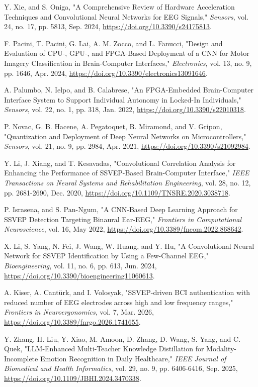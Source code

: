  Y. Xie, and S. Oniga, "A Comprehensive Review of Hardware Acceleration Techniques and Convolutional Neural Networks for EEG Signals," \textit{Sensors}, vol. 24, no. 17, pp. 5813, Sep. 2024, \url{https://doi.org/10.3390/s24175813}.

 F. Pacini, T. Pacini, G. Lai, A. M. Zocco, and L. Fanucci, "Design and Evaluation of CPU-, GPU-, and FPGA-Based Deployment of a CNN for Motor Imagery Classification in Brain-Computer Interfaces," \textit{Electronics}, vol. 13, no. 9, pp. 1646, Apr. 2024, \url{https://doi.org/10.3390/electronics13091646}.

 A. Palumbo, N. Ielpo, and B. Calabrese, "An FPGA-Embedded Brain-Computer Interface System to Support Individual Autonomy in Locked-In Individuals," \textit{Sensors}, vol. 22, no. 1, pp. 318, Jan. 2022, \url{https://doi.org/10.3390/s22010318}.

 P. Novac, G. B. Hacene, A. Pegatoquet, B. Miramond, and V. Gripon, "Quantization and Deployment of Deep Neural Networks on Microcontrollers," \textit{Sensors}, vol. 21, no. 9, pp. 2984, Apr. 2021, \url{https://doi.org/10.3390/s21092984}.

 Y. Li, J. Xiang, and T. Kesavadas, "Convolutional Correlation Analysis for Enhancing the Performance of SSVEP-Based Brain-Computer Interface," \textit{IEEE Transactions on Neural Systems and Rehabilitation Engineering}, vol. 28, no. 12, pp. 2681-2690, Dec. 2020, \url{https://doi.org/10.1109/TNSRE.2020.3038718}.

 P. Israsena, and S. Pan-Ngum, "A CNN-Based Deep Learning Approach for SSVEP Detection Targeting Binaural Ear-EEG," \textit{Frontiers in Computational Neuroscience}, vol. 16, May 2022, \url{https://doi.org/10.3389/fncom.2022.868642}.

 X. Li, S. Yang, N. Fei, J. Wang, W. Huang, and Y. Hu, "A Convolutional Neural Network for SSVEP Identification by Using a Few-Channel EEG," \textit{Bioengineering}, vol. 11, no. 6, pp. 613, Jun. 2024, \url{https://doi.org/10.3390/bioengineering11060613}.

 A. Kiser, A. Cantürk, and I. Volosyak, "SSVEP-driven BCI authentication with reduced number of EEG electrodes across high and low frequency ranges," \textit{Frontiers in Neuroergonomics}, vol. 7, Mar. 2026, \url{https://doi.org/10.3389/fnrgo.2026.1741655}.

 Y. Zhang, H. Liu, Y. Xiao, M. Amoon, D. Zhang, D. Wang, S. Yang, and C. Quek, "LLM-Enhanced Multi-Teacher Knowledge Distillation for Modality-Incomplete Emotion Recognition in Daily Healthcare," \textit{IEEE Journal of Biomedical and Health Informatics}, vol. 29, no. 9, pp. 6406-6416, Sep. 2025, \url{https://doi.org/10.1109/JBHI.2024.3470338}.

